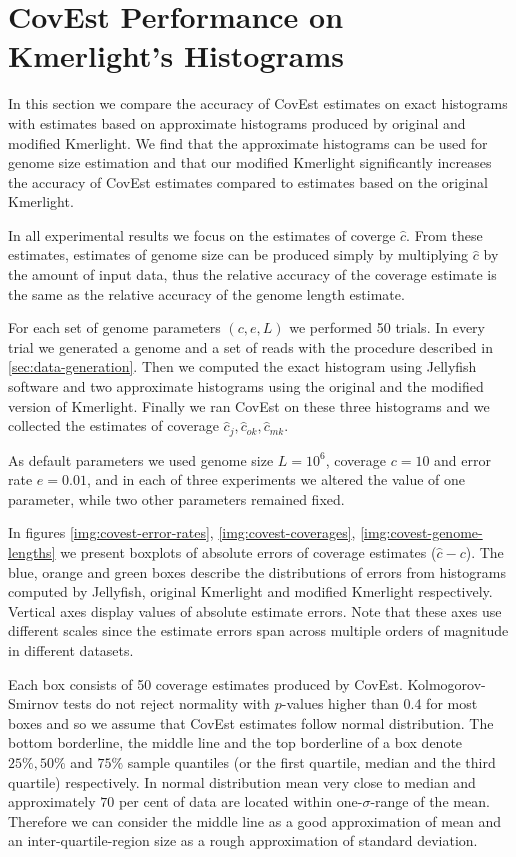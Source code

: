 \section{CovEst Performance on Kmerlight's Histograms}
In this section we compare the accuracy of CovEst estimates on exact histograms
with estimates based on approximate histograms produced by original and modified Kmerlight.
We find that the approximate histograms can be used for genome size estimation and that
our modified Kmerlight significantly increases the accuracy of CovEst estimates compared to
estimates based on the original Kmerlight.

In all experimental results we focus on the estimates of coverge $\hat c$. From these estimates,
estimates of genome size can be produced simply by multiplying $\hat c$ by the amount of input
data, thus the relative accuracy of the coverage estimate is the same as the relative accuracy of 
the genome length estimate.

For each set of genome parameters $(c, e, L)$ we performed 50 trials.
In every trial we generated a genome and a set of reads with the procedure described
in \ref{sec:data-generation}. Then we computed the exact histogram using Jellyfish software
and two approximate histograms using the original and the modified version of Kmerlight.
Finally we ran CovEst on these three histograms and we collected the estimates of coverage
$\hat c_j, \hat c_{ok}, \hat c_{mk}$. 

As default parameters we used genome size $L=10^6$, coverage $c=10$ and error rate $e=0.01$,
and in each of three experiments we altered the value of one parameter, while two other parameters
remained fixed. 

In figures \ref{img:covest-error-rates}, \ref{img:covest-coverages}, 
\ref{img:covest-genome-lengths} we present boxplots of absolute errors of coverage estimates
($\hat c - c$). The blue, orange and green boxes describe the distributions of errors
from histograms computed by Jellyfish, original Kmerlight and modified Kmerlight respectively.
Vertical axes display values of absolute estimate errors. Note that these axes use different
scales since the estimate errors span across multiple orders of magnitude in different datasets.

Each box consists of 50 coverage estimates produced by CovEst. Kolmogorov-Smirnov tests do not
reject normality with $p$-values higher than 0.4 for most boxes and so we assume that CovEst
estimates follow normal distribution. The bottom borderline, the middle line 
and the top borderline of a box denote $25\%, 50\%$ and $75\%$ sample quantiles (or 
the first quartile, median and the third quartile) respectively. In normal distribution mean
very close to median and approximately $70$ per cent of data are located within one-$\sigma$-range 
of the mean. Therefore we can consider the middle line as a good approximation of mean and 
an inter-quartile-region size as a rough approximation of standard deviation.    


